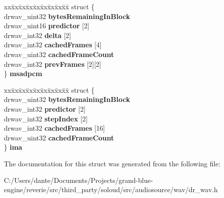 \begin{DoxyCompactItemize}
\begin{tabbing}
\end{tabbing}\item 
\mbox{\label{structdrwav_a55ef38ea6cef4e2cf4038dfca246209d}} 
\begin{tabbing}
xx\=xx\=xx\=xx\=xx\=xx\=xx\=xx\=xx\=\kill
struct \{\\
\>drwav\_uint32 {\bfseries bytesRemainingInBlock}\\
\>drwav\_uint16 {\bfseries predictor} \mbox{[}2\mbox{]}\\
\>drwav\_int32 {\bfseries delta} \mbox{[}2\mbox{]}\\
\>drwav\_int32 {\bfseries cachedFrames} \mbox{[}4\mbox{]}\\
\>drwav\_uint32 {\bfseries cachedFrameCount}\\
\>drwav\_int32 {\bfseries prevFrames} \mbox{[}2\mbox{]}\mbox{[}2\mbox{]}\\
\} {\bfseries msadpcm}\\

\end{tabbing}\item 
\mbox{\label{structdrwav_ab399e52c238d153dc0ff270c6b56fd2d}} 
\begin{tabbing}
xx\=xx\=xx\=xx\=xx\=xx\=xx\=xx\=xx\=\kill
struct \{\\
\>drwav\_uint32 {\bfseries bytesRemainingInBlock}\\
\>drwav\_int32 {\bfseries predictor} \mbox{[}2\mbox{]}\\
\>drwav\_int32 {\bfseries stepIndex} \mbox{[}2\mbox{]}\\
\>drwav\_int32 {\bfseries cachedFrames} \mbox{[}16\mbox{]}\\
\>drwav\_uint32 {\bfseries cachedFrameCount}\\
\} {\bfseries ima}\\

\end{tabbing}\end{DoxyCompactItemize}


The documentation for this struct was generated from the following file\+:\begin{DoxyCompactItemize}
\item 
C\+:/\+Users/dante/\+Documents/\+Projects/grand-\/blue-\/engine/reverie/src/third\+\_\+party/soloud/src/audiosource/wav/dr\+\_\+wav.\+h\end{DoxyCompactItemize}
